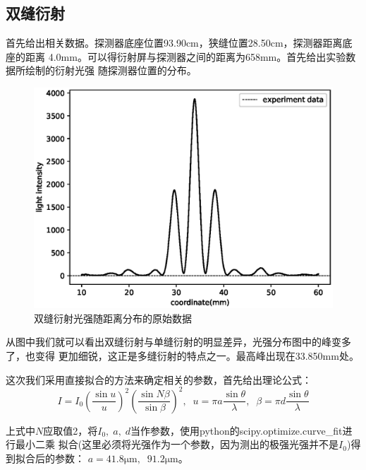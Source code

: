 \documentclass[a4paper]{ctexart}
\begin{document}
    \subsection{双缝衍射}
    \par 
    首先给出相关数据。探测器底座位置93.90cm，狭缝位置28.50cm，探测器距离底座的距离
    4.0mm。可以得衍射屏与探测器之间的距离为658mm。首先给出实验数据所绘制的衍射光强
    随探测器位置的分布。
    \begin{figure}[htbp]
        \centering
        \includegraphics[scale=0.85]{image/double_original.eps}
        \caption{双缝衍射光强随距离分布的原始数据}
    \end{figure}
    \par 
    从图中我们就可以看出双缝衍射与单缝衍射的明显差异，光强分布图中的峰变多了，也变得
    更加细锐，这正是多缝衍射的特点之一。最高峰出现在33.850mm处。
    \par 
    这次我们采用直接拟合的方法来确定相关的参数，首先给出理论公式：
    \begin{equation}
        I = I_{0} \left(\frac{\sin u}{u}\right)^{2} \left(\frac{\sin N \beta}{\sin \beta}\right)^{2},\;\;
        u = \pi a \frac{\sin \theta}{\lambda},\;\; \beta = \pi d \frac{\sin \theta}{\lambda}
    \end{equation}
    \par 
    上式中$N$应取值2，将$I_{0},\; a,\; d$当作参数，使用python的scipy.optimize.curve\_fit进行最小二乘
    拟合(这里必须将光强作为一个参数，因为测出的极强光强并不是$I_{0}$)得到拟合后的参数：
    $a = 41.8 \mathrm{\mu m},\;\; 91.2 \mathrm{\mu m}$。
\end{document}
